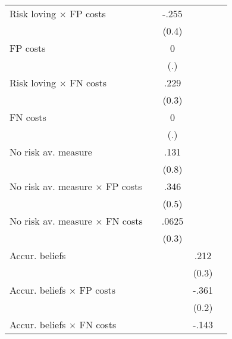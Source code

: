\begin{table}[htbp]
\begin{tabular}{l*{4}{c}}
Risk loving $\times$ FP costs&                  &    -.255         &                  &                  \\
                &                  &    (0.4)         &                  &                  \\
FP costs        &                  &        0         &                  &                  \\
                &                  &      (.)         &                  &                  \\
Risk loving $\times$ FN costs&                  &     .229         &                  &                  \\
                &                  &    (0.3)         &                  &                  \\
FN costs        &                  &        0         &                  &                  \\
                &                  &      (.)         &                  &                  \\
No risk av. measure&                  &     .131         &                  &                  \\
                &                  &    (0.8)         &                  &                  \\
No risk av. measure $\times$ FP costs&                  &     .346         &                  &                  \\
                &                  &    (0.5)         &                  &                  \\
No risk av. measure $\times$ FN costs&                  &    .0625         &                  &                  \\
                &                  &    (0.3)         &                  &                  \\
Accur. beliefs  &                  &                  &     .212         &                  \\
                &                  &                  &    (0.3)         &                  \\
Accur. beliefs $\times$ FP costs&                  &                  &    -.361         &                  \\
                &                  &                  &    (0.2)         &                  \\
Accur. beliefs $\times$ FN costs&                  &                  &    -.143         &                  \\

\end{tabular}
\end{table}
